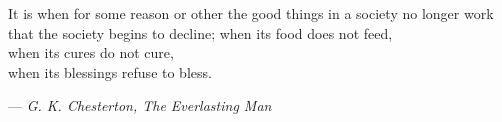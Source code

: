 \begin{titlepage}
\begin{center}
\end{center}

\vspace*{\fill}

\cleardoublepage %

\thispagestyle{empty}
\vspace*{\fill}
\begin{center}
\end{center}
\vspace*{\fill}

\clearpage

\vspace*{7em}
\begin{minipage}{4in}
\begin{center}
It is when for some reason or other the good things in a society no longer work that the society begins to decline;
\baselineskip
when its food does not feed, \\
when its cures do not cure, \\ 
when its blessings refuse to bless. 
\end{center}
\hfill --- \textit{G. K. Chesterton, The Everlasting Man}
\end{minipage}

\clearpage

\end{titlepage}
